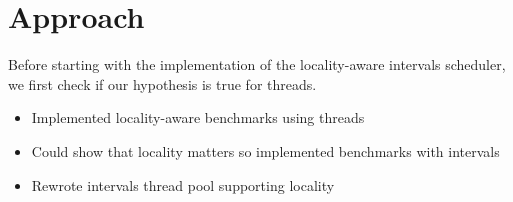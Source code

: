 
\chapter{Approach}
\label{chap:locality-approach}

Before starting with the implementation of the locality-aware
intervals scheduler, we first check if our hypothesis is true for
threads.

\begin{itemize}
\item Implemented locality-aware benchmarks using threads
\item Could show that locality matters so implemented benchmarks with
  intervals
\item Rewrote intervals thread pool supporting locality
\end{itemize}



